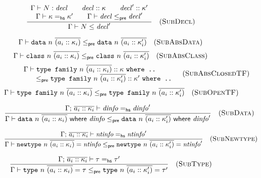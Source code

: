 \begin{figure}


\[
\frac{
\begin{array}{c}
\Gamma \vdash N : \mathit{decl} \qquad
\mathit{decl} :: \kappa \qquad
\mathit{decl}' :: \kappa' \\
\Gamma \vdash \kappa =_\mathsf{hs} \kappa' \qquad
\Gamma \vdash \mathit{decl} \le_\textsf{pre} \mathit{decl}'
\end{array}
}{
\Gamma \vdash N \le \mathit{decl}'
}
\quad(\textsc{SubDecl})
\]


\[
\Gamma \vdash \texttt{data}~n~\overline{(a_i :: \kappa_i)} \le_\textsf{pre} \texttt{data}~n~\overline{(a_i :: \kappa'_i)}
\quad(\textsc{SubAbsData})
\]
\[
\Gamma \vdash \texttt{class}~n~\overline{(a_i :: \kappa_i)} \le_\textsf{pre} \texttt{class}~n~\overline{(a_i :: \kappa'_i)}
\quad(\textsc{SubAbsClass})
\]
\[
\begin{array}{c}
\Gamma \vdash \texttt{type family}~n~\overline{(a_i :: \kappa_i)} :: \kappa ~\texttt{where ..} \\
\qquad\qquad\le_\textsf{pre} \texttt{type family}~n~\overline{(a_i :: \kappa'_i)} :: \kappa' ~\texttt{where ..}
\end{array}
\quad(\textsc{SubAbsClosedTF})
\]
\[
\Gamma \vdash \texttt{type family}~n~\overline{(a_i :: \kappa_i)} \le_\textsf{pre} \texttt{type family}~n~\overline{(a_i :: \kappa'_i)}
\quad(\textsc{SubOpenTF})
\]


\[
\frac{
\Gamma;\, \overline{a_i :: \kappa_i} \vdash \mathit{dinfo} =_\textsf{hs} \mathit{dinfo}'
}{
\Gamma \vdash \texttt{data}~n~\overline{(a_i :: \kappa_i)} ~\textsf{where}~ \mathit{dinfo} \le_\textsf{pre} \texttt{data}~n~\overline{(a_i :: \kappa'_i)} ~\textsf{where}~ \mathit{dinfo}'
}
\quad(\textsc{SubData})
\]

\[
\frac{
\Gamma;\, \overline{a_i :: \kappa_i} \vdash \mathit{ntinfo} =_\textsf{hs} \mathit{ntinfo}'
}{
\Gamma \vdash \texttt{newtype}~n~\overline{(a_i :: \kappa_i)} = \mathit{ntinfo} \le_\textsf{pre} \texttt{newtype}~n~\overline{(a_i :: \kappa'_i)} = \mathit{ntinfo}'
}
\quad(\textsc{SubNewtype})
\]

\[
\frac{
\Gamma;\, \overline{a_i :: \kappa_i} \vdash \tau =_\textsf{hs} \tau'
}{
\Gamma \vdash \texttt{type}~n~\overline{(a_i :: \kappa_i)} = \tau \le_\textsf{pre} \texttt{type}~n~\overline{(a_i :: \kappa'_i)} = \tau'
}
\quad(\textsc{SubType})
\]


\end{figure}
